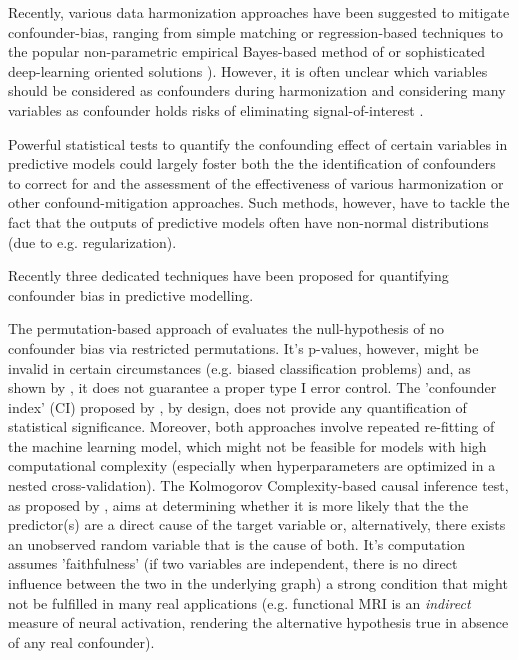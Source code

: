 \documentclass{article}
\theoremstyle{definition}
\begin{document}
Recently, various data harmonization approaches have been suggested to mitigate confounder-bias, ranging from simple matching \citep{rao2017predictive} or regression-based techniques \citep{rao2017predictive, dukart2011age, spisak2014voxel abdulkadir2014reduction} to the popular non-parametric empirical Bayes-based method of \cite{johnson2007adjusting} or sophisticated deep-learning oriented solutions \citep{zhao2020training, hognon2019standardization}). However, it is often unclear which variables should be considered as confounders during harmonization and considering many variables as confounder holds risks of eliminating signal-of-interest \citep{wachinger2021detect}.

Powerful statistical tests to quantify the confounding effect of certain variables in predictive models could largely foster both the the identification of confounders to correct for and the assessment of the effectiveness of various harmonization or other confound-mitigation approaches. Such methods, however, have to tackle the fact that the outputs of predictive models often have non-normal distributions (due to e.g. regularization).

Recently three dedicated techniques \citep{chaibub2019permutation, ferrari2020measuring, wachinger2021detect} have been proposed for quantifying confounder bias in predictive modelling.

The permutation-based approach of \cite{chaibub2019permutation} evaluates the null-hypothesis of no confounder bias via restricted permutations. It's p-values, however, might be invalid in certain circumstances (e.g. biased classification problems) and, as shown by \cite{ferrari2020measuring}, it does not guarantee a proper type I error control.
The 'confounder index' (CI) proposed by \cite{ferrari2020measuring}, by design, does not provide any quantification of statistical significance.
Moreover, both approaches involve repeated re-fitting of the machine learning model, which might not be feasible for models with high computational complexity (especially when hyperparameters are optimized in a nested cross-validation).
The Kolmogorov Complexity-based causal inference test, as proposed by \cite{wachinger2021detect}, aims at determining whether it is more likely that the the predictor(s) are a direct cause of the target variable or, alternatively, there exists an unobserved random variable that is the cause of both. It's computation assumes 'faithfulness' (if two variables are independent, there is no direct influence between the two in the underlying graph) a strong condition that might not be fulfilled in many real applications (e.g. functional MRI is an \emph{indirect} measure of neural activation, rendering the alternative hypothesis true in absence of any real confounder).
\end{document}
